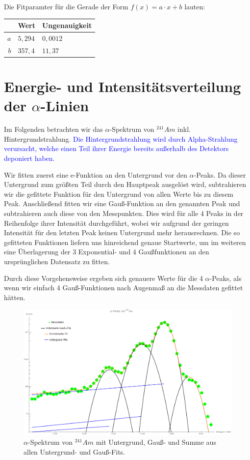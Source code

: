 \documentclass[bigchapter,colorback,accentcolor=tud4b,linedtoc,11pt]{tudreport}
\begin{document}
Die Fitparamter für die Gerade der Form $f(x)=a \cdot x + b$ lauten:
\color{blue}
\begin{center}
  \begin{tabular}{r|ll}
        & Wert    & Ungenauigkeit \\ \hline
    $a$ & $5,294$ & $0,0012$      \\ 
    $b$ & $357,4$ & $11,37$       \\ 
  \end{tabular}%
\end{center}
\color{black}



\section{Energie- und Intensitätsverteilung der $\alpha$-Linien}

Im Folgenden betrachten wir das $\alpha$-Spektrum von $^{241}Am$
inkl. Hintergrundstrahlung. \textcolor{blue}{Die Hintergrundstrahlung wird durch Alpha-Strahlung
verursacht, welche einen Teil ihrer Energie bereits außerhalb des Detektors
deponiert haben.}

Wir fitten zuerst eine e-Funktion an den Untergrund vor den $\alpha$-Peaks. Da
dieser Untergrund zum größten Teil durch den Hauptpeak ausgelöst wird,
subtrahieren wir die gefittete Funktion für den Untergrund von allen Werte bis
zu diesem Peak. Anschließend fitten wir eine Gauß-Funktion an den genannten Peak
und subtrahieren auch diese von den Messpunkten. Dies wird für alle 4 Peaks in
der Reihenfolge ihrer Intensität durchgeführt, wobei wir aufgrund der geringen
Intensität für den letzten Peak keinen Untergrund mehr herausrechnen. Die so
gefitteten Funktionen liefern uns hinreichend genaue Startwerte, um im weiteren
eine Überlagerung der 3 Exponential- und 4 Gaußfunktionen an den ursprünglichen
Datensatz zu fitten.

Durch diese Vorgehensweise ergeben sich genauere Werte für die 4 $\alpha$-Peaks,
als wenn wir einfach 4 Gauß-Funktionen nach Augenmaß an die Messdaten gefittet hätten.

\begin{figure}[H] 
  \centering
     \includegraphics[width=1\textwidth]{img/alpha-spektrum.png}
  \caption{$\alpha$-Spektrum von $^{241}Am$ mit Untergrund, Gauß- und
    Summe aus allen Untergrund- und Gauß-Fits.}
  \label{fig:Bild1}
\end{figure}
\end{document}
